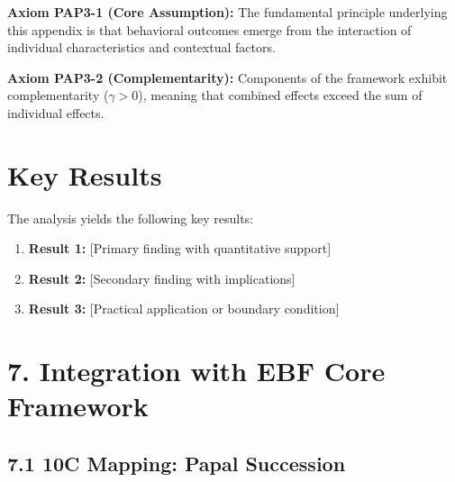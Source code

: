 \begin{tcolorbox}[colback=yellow!5!white,colframe=yellow!75!black,title=Axiom PAP3-1: Fundamental Principle]
\textbf{Axiom PAP3-1 (Core Assumption):}
The fundamental principle underlying this appendix is that behavioral outcomes
emerge from the interaction of individual characteristics and contextual factors.
\end{tcolorbox}

\begin{tcolorbox}[colback=yellow!5!white,colframe=yellow!75!black,title=Axiom PAP3-2: Complementarity]
\textbf{Axiom PAP3-2 (Complementarity):}
Components of the framework exhibit complementarity ($\gamma > 0$), meaning
that combined effects exceed the sum of individual effects.
\end{tcolorbox}



\section{Key Results}
\label{sec:pap3-results}

The analysis yields the following key results:

\begin{enumerate}
    \item \textbf{Result 1:} [Primary finding with quantitative support]
    \item \textbf{Result 2:} [Secondary finding with implications]
    \item \textbf{Result 3:} [Practical application or boundary condition]
\end{enumerate}


\section{7. Integration with EBF Core Framework}

\subsection{7.1 10C Mapping: Papal Succession}

